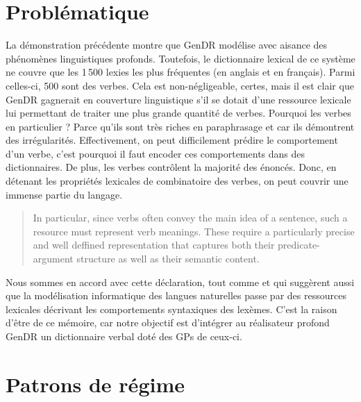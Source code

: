 \section{Problématique}\label{sec:problema}

La démonstration précédente montre que GenDR modélise avec aisance des phénomènes linguistiques profonds. Toutefois, le dictionnaire lexical de ce système ne couvre que les 1\,500 lexies les plus fréquentes (en anglais et en français). Parmi celles-ci, 500 sont des verbes. Cela est non-négligeable, certes, mais il est clair que GenDR gagnerait en couverture linguistique s'il se dotait d'une ressource lexicale lui permettant de traiter une plus grande quantité de verbes. Pourquoi les verbes en particulier ? Parce qu'ils sont très riches en paraphrasage et car ils démontrent des irrégularités. Effectivement, on peut difficilement prédire le comportement d'un verbe, c'est pourquoi il faut encoder ces comportements dans des dictionnaires. De plus, les verbes contrôlent la majorité des énoncés. Donc, en détenant les propriétés lexicales de combinatoire des verbes, on peut couvrir une immense partie du langage.

\begin{quote}
In particular, since verbs often convey the main idea of a sentence, such a resource must represent verb meanings. These require a particularly precise and well deffined representation that captures both their predicate-argument structure as well as their semantic content.
\end{quote}
\vspace{-\baselineskip}
\hfill
\cite{SchulerVerbnetBroadcoverageComprehensive2005}

Nous sommes en accord avec cette déclaration, tout comme \cite{Korhonenlargesubcategorizationlexicon2006} et \cite{MESSIANT08.142} qui suggèrent aussi que la modélisation informatique des langues naturelles passe par des ressources lexicales décrivant les comportements syntaxiques des lexèmes.  C'est la raison d'être de ce mémoire, car notre objectif est d'intégrer au réalisateur profond GenDR  un dictionnaire verbal doté des \acp{GP} de ceux-ci.

\section{Patrons de régime}\label{sec:gp}

